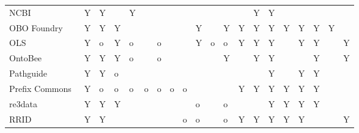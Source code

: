\begin{table}
\begin{tabular}{llllllllllllllllllll}
                  NCBI~\cite{Clark2016} &              Y &        Y &       &          Y &            &          &                &               &         &         &         &                            &         Y &                 Y &                    &               &                 &                &               \\
         OBO Foundry~\cite{Jackson2021} &              Y &        Y &     Y &            &            &          &                &               &       Y &         &       Y &                          Y &         Y &                 Y &                  Y &             Y &               Y &              Y &               \\
                   OLS~\cite{Cote2006a} &              Y &        o &     Y &          o &            &        o &                &               &       Y &       o &       o &                          Y &         Y &                 Y &                    &             Y &               Y &                &             Y \\
                 OntoBee~\cite{Ong2017} &              Y &        Y &     Y &          o &            &        o &                &               &         &         &       Y &                            &         Y &                 Y &                    &               &               Y &                &             Y \\
                              Pathguide &              Y &        Y &     o &            &            &          &                &               &         &         &         &                            &           &                 Y &                    &             Y &               Y &                &               \\
    Prefix Commons~\cite{prefixcommons} &              Y &        o &     o &          o &          o &        o &              o &             o &         &         &         &                          Y &         Y &                 Y &                  Y &             Y &               Y &                &               \\
              re3data~\cite{Pampel2013} &              Y &        Y &     Y &            &            &          &                &               &       o &         &       o &                            &           &                 Y &                  Y &             Y &               Y &                &               \\
                                   RRID &              Y &        Y &       &            &            &          &                &             o &       o &         &       o &                          Y &         Y &                 Y &                  Y &             Y &                 &                &             Y \\

\end{tabular}
\end{table}
